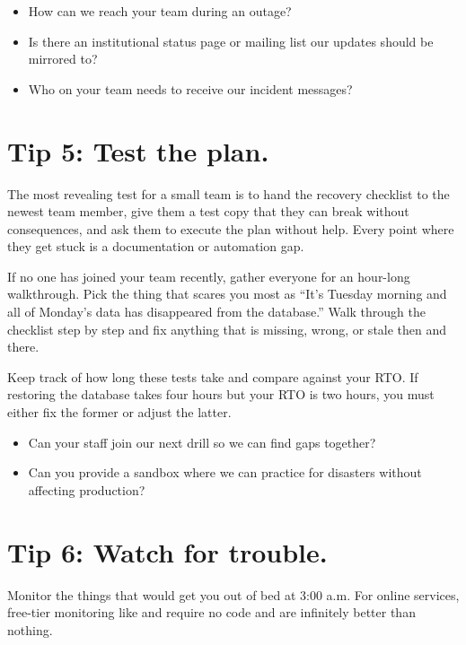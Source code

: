 \documentclass[10pt,letterpaper]{article}
\begin{document}
\begin{notebox}
  \begin{itemize}
  \item How can we reach your team during an outage?
  \item Is there an institutional status page or mailing list our updates should be mirrored to?
  \item Who on your team needs to receive our incident messages?
  \end{itemize}
\end{notebox}

\section*{Tip 5: Test the plan.}

The most revealing test for a small team is to hand the recovery checklist to
the newest team member, give them a test copy that they can break without
consequences, and ask them to execute the plan without help. Every point where
they get stuck is a documentation or automation gap.

If no one has joined your team recently, gather everyone for an hour-long
walkthrough. Pick the thing that scares you most as ``It's Tuesday morning and
all of Monday's data has disappeared from the database.'' Walk through the
checklist step by step and fix anything that is missing, wrong, or stale then
and there.

Keep track of how long these tests take and compare against your RTO. If
restoring the database takes four hours but your RTO is two hours, you must
either fix the former or adjust the latter.

\begin{notebox}
  \begin{itemize}
  \item Can your staff join our next drill so we can find gaps together?
  \item Can you provide a sandbox where we can practice for disasters without affecting production?
  \end{itemize}
\end{notebox}

\section*{Tip 6: Watch for trouble.}

Monitor the things that would get you out of bed at 3:00 a.m. For online
services, free-tier monitoring like 
and  require no code and are
infinitely better than nothing.
\end{document}
